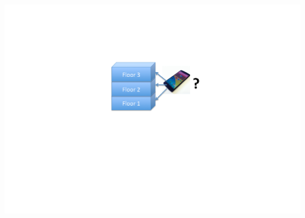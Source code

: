 \documentclass[xcolor=svgnames,english,presentation]{beamer}
\begin{document}
\begin{frame}
\begin{columns}
\begin{column}{0.3\textwidth}
  \includegraphics[width=\columnwidth]{floor}
  \end{column}
  \end{columns}
\end{frame}
\end{document}
